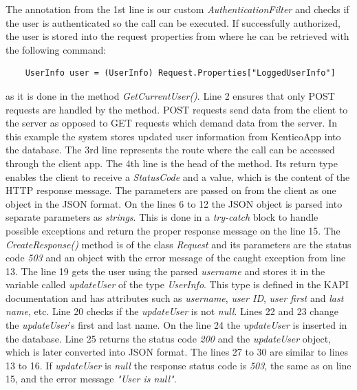 The annotation from the 1st line is our custom \textit{AuthenticationFilter} and checks if the user is authenticated so the call can be executed. If successfully authorized, the user is stored into the request properties from where he can be retrieved with the following command:
\lstset{style=sharpc, numbers = none}
\begin{lstlisting}
	UserInfo user = (UserInfo) Request.Properties["LoggedUserInfo"]
\end{lstlisting}
as it is done in the method \textit{GetCurrentUser()}.
Line 2 ensures that only POST requests are handled by the method. POST requests send data from the client to the server as opposed to GET requests which demand data from the server. In this example the system stores updated user information from KenticoApp into the database. The 3rd line represents the route where the call can be accessed through the client app. The 4th line is the head of the method. Its return type enables the client to receive a \textit{StatusCode} and a value, which is the content of the HTTP response message. The parameters are passed on from the client as one object in the JSON format. On the lines 6 to 12 the JSON object is parsed into separate parameters as \textit{strings}. This is done in a \textit{try-catch} block to handle possible exceptions and return the proper response message on the line 15. The \textit{CreateResponse()} method is of the class \textit{Request} and its parameters are the status code \textit{503} and an object with the error message of the caught exception from line 13. The line 19 gets the user using the parsed \textit{username} and stores it in the variable called \textit{updateUser} of the type \textit{UserInfo}. This type is defined in the KAPI documentation and has attributes such as \textit{username}, \textit{user ID}, \textit{user first} and \textit{last name}, etc. Line 20 checks if the \textit{updateUser} is not \textit{null}. Lines 22 and 23 change the \textit{updateUser}'s first and last name. On the line 24 the \textit{updateUser} is inserted in the database. Line 25 returns the status code \textit{200} and the \textit{updateUser} object, which is later converted into JSON format. The lines 27 to 30 are similar to lines 13 to 16. If \textit{updateUser} is \textit{null} the response status code is \textit{503}, the same as on line 15, and the error message \textit{"User is null"}. 

